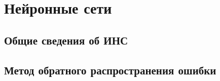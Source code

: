 \section{Нейронные сети}
	\subsection{Общие сведения об ИНС}
	\subsection{Метод обратного распространения ошибки}

